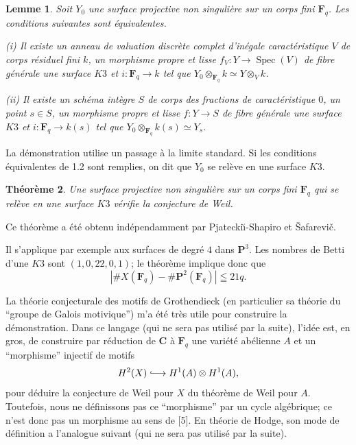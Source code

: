 \documentclass[11pt]{amsart}
\theoremstyle{plain}
\newtheorem{theoreme}{Th\'eor\`eme}[section]
\newtheorem{lemme}[theoreme]{Lemme}
\theoremstyle{definition}
\theoremstyle{remark}
\begin{document}
\begin{lemme}
Soit $Y_0$ une surface projective non singuli\`ere sur un corps fini $\mathbf{F}_q$. Les conditions suivantes sont \'equivalentes.

\textup{(i)} Il existe un anneau de valuation discr\`ete complet d'in\'egale caract\'eristique $V$ de corps r\'esiduel fini $k$, un morphisme propre et lisse $f_V\colon Y\to\operatorname{Spec}(V)$ de fibre g\'en\'erale une surface $K3$ et $i\colon\mathbf{F}_q\to k$ tel que $Y_0\otimes_{\mathbf{F}_q}k\simeq Y\otimes_V k$.

\textup{(ii)} Il existe un sch\'ema int\`egre $S$ de corps des fractions de caract\'eristique $0$, un point $s\in S$, un morphisme propre et lisse $f\colon Y\to S$ de fibre g\'en\'erale une surface $K3$ et $i\colon\mathbf{F}_q\to k(s)$ tel que $Y_0\otimes_{\mathbf{F}_q}k(s)\simeq Y_s$.
\end{lemme}

La d\'emonstration utilise un passage \`a la limite standard. Si les conditions \'equivalentes de 1.2 sont remplies, on dit que $Y_0$ se rel\`eve en une surface $K3$.

\begin{theoreme}\label{thm:1.3}
Une surface projective non singuli\`ere sur un corps fini $\mathbf{F}_q$ qui se rel\`eve en une surface $K3$ v\'erifie la conjecture de Weil.
\end{theoreme}

Ce th\'eor\`eme a \'et\'e obtenu ind\'ependamment par Pjatecki\u{\i}-Shapiro et \v{S}afarevi\v{c}.

Il s'applique par exemple aux surfaces de degr\'e $4$ dans $\mathbf{P}^3$. Les nombres de Betti d'une $K3$ sont $(1,0,22,0,1)$; le th\'eor\`eme implique donc que
\begin{equation*}
|\#X(\mathbf{F}_q)-\#\mathbf{P}^2(\mathbf{F}_q)|\leqq 21q.
\end{equation*}

La th\'eorie conjecturale des motifs de Grothendieck (en particulier sa th\'eorie du ``groupe de Galois motivique'') m'a \'et\'e tr\`es utile pour construire la d\'emonstration. Dans ce langage (qui ne sera pas utilis\'e par la suite), l'id\'ee est, en gros, de construire par r\'eduction de $\mathbf{C}$ \`a $\mathbf{F}_q$ une vari\'et\'e ab\'elienne $A$ et un ``morphisme'' injectif de motifs
\begin{equation*}
H^2(X)\lhook\joinrel\longrightarrow H^1(A)\otimes H^1(A),
\end{equation*}
pour d\'eduire la conjecture de Weil pour $X$ du th\'eor\`eme de Weil pour $A$. Toutefois, nous ne d\'efinissons pas ce ``morphisme'' par un cycle alg\'ebrique; ce n'est donc pas un morphisme au sens de [5]. En th\'eorie de Hodge, son mode de d\'efinition a l'analogue suivant (qui ne sera pas utilis\'e par la suite).
\end{document}
